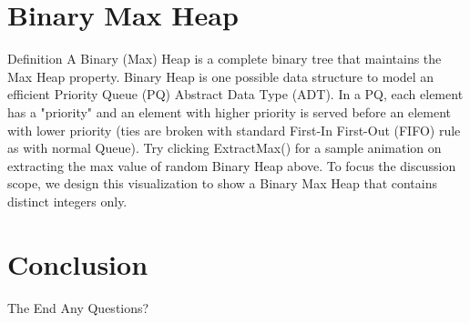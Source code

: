 \documentclass{beamer}
\begin{document}
\section{Binary Max Heap}
\begin{frame}{Definition}
  A Binary (Max) Heap is a complete binary tree that maintains the Max Heap property.
  Binary Heap is one possible data structure to model an efficient Priority Queue (PQ) Abstract Data Type (ADT). In a PQ, each element has a "priority" and an element with higher priority is served before an element with lower priority (ties are broken with standard First-In First-Out (FIFO) rule as with normal Queue). Try clicking ExtractMax() for a sample animation on extracting the max value of random Binary Heap above.
  To focus the discussion scope, we design this visualization to show a Binary Max Heap that contains distinct integers only.
\end{frame}


\section{Conclusion}
\begin{frame}{The End}
    Any Questions?
\end{frame}
\end{document}
